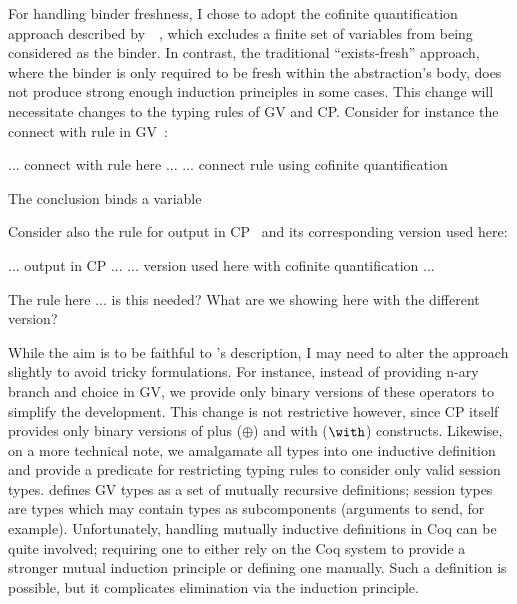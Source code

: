 \documentclass{mprop}
\newcommand{\1}{\textbf{1}\xspace}
\begin{document}
For handling binder freshness, I chose to adopt the cofinite quantification approach described by~\cite{Aydemir:2008:EFM}~\cite{Aydemir:2008:EFM}, which excludes a finite set of variables from being considered as the binder. In contrast, the traditional ``exists-fresh'' approach, where the binder is only required to be fresh within the abstraction's body, does not produce strong enough induction principles in some cases. This change will necessitate changes to the typing rules of GV and CP. Consider for instance the connect with rule in GV~\cite{Wadler:2012}:

... connect with rule here ... ... connect rule using cofinite quantification

The conclusion binds a variable

Consider also the rule for output in CP~\cite{Wadler:2012} and its corresponding version used here:

... output in CP ... ... version used here with cofinite quantification ...

The rule here ... is this needed? What are we showing here with the different version?

While the aim is to be faithful to \citeauthor{Wadler:2012}'s description, I may need to alter the approach slightly to avoid tricky formulations. For instance, instead of providing n-ary branch and choice in GV, we provide only binary versions of these operators to simplify the development. This change is not restrictive however, since CP itself provides only binary versions of plus ($\oplus$) and with ($\with$) constructs. Likewise, on a more technical note, we amalgamate all types into one inductive definition and provide a predicate for restricting typing rules to consider only valid session types. \citeauthor{Wadler:2012} defines GV types as a set of mutually recursive definitions; session types are types which may contain types as subcomponents (arguments to send, for example). Unfortunately, handling mutually inductive definitions in Coq can be quite involved; requiring one to either rely on the Coq system to provide a stronger mutual induction principle or defining one manually. Such a definition is possible, but it complicates elimination via the induction principle.
\end{document}
